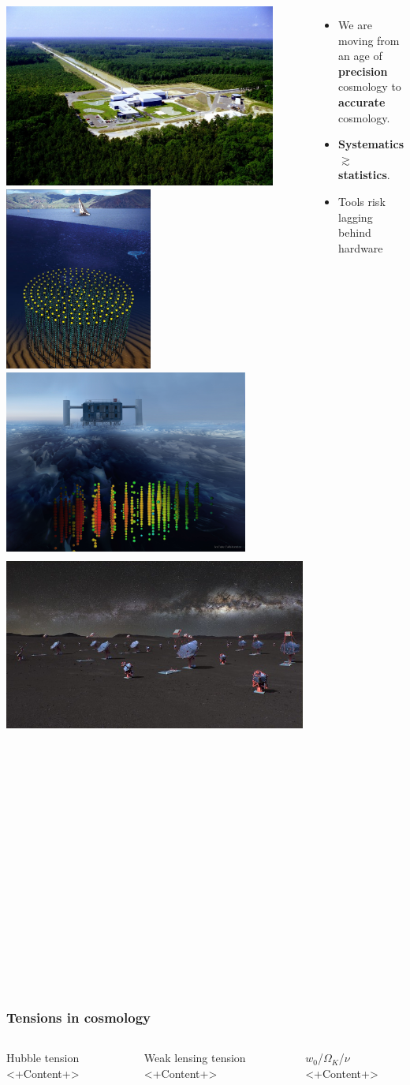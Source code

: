 \documentclass[aspectratio=169]{beamer}
\begin{document}
\begin{frame}
\begin{columns}
        \includegraphics[height=0.18428\textwidth]{figures/telescopes/ligo}%
        \includegraphics[height=0.18428\textwidth]{figures/telescopes/km3n}%
        \includegraphics[height=0.18428\textwidth]{figures/telescopes/icecube}%
        \includegraphics[height=0.18428\textwidth]{figures/telescopes/CTA}%

        \begin{itemize}
            \item We are moving from an age of \textbf{precision} cosmology to \textbf{accurate} cosmology.
            \item \textbf{Systematics} $\gtrsim$ \textbf{statistics}.
            \item Tools risk lagging behind hardware
        \end{itemize}

    \end{columns}
\end{frame}

\begin{frame}
    \frametitle{Tensions in cosmology}
    \begin{columns}
        \begin{block}{Hubble tension}
            <+Content+>
        \end{block}
        \begin{block}{Weak lensing tension}
            <+Content+>
        \end{block}
        \begin{block}{$w_0$/$\Omega_K$/$\nu$}
            <+Content+>
        \end{block}
    \end{columns}
\end{frame}
\end{document}
